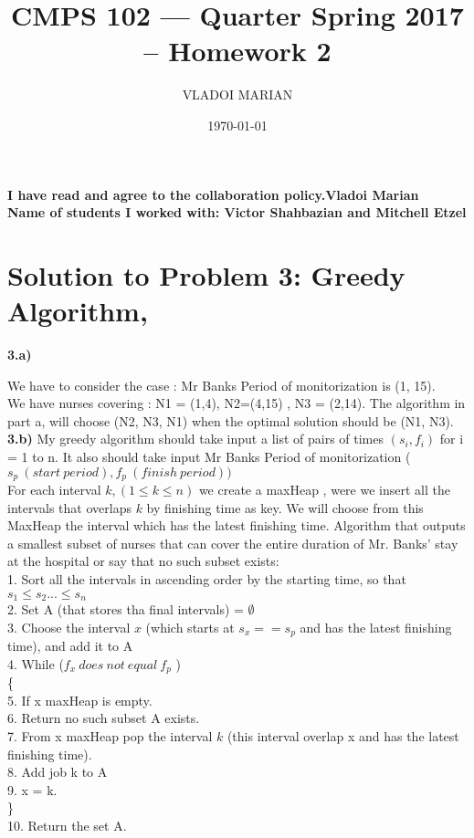 \documentclass[11 pt]{article}
\title{ CMPS 102 --- Quarter  Spring 2017 --  Homework 2}
\author{VLADOI MARIAN}
\date{\today}
\begin{document}
\maketitle



\begin{center}
{\bf I have read and agree to the collaboration policy.Vladoi Marian}\\
{\bf Name of students I worked with: Victor Shahbazian and Mitchell Etzel }
\end{center}


\section*{Solution to Problem 3: Greedy Algorithm,}

\textbf{3.a)} 

We have to consider the case : 
Mr Banks Period  of monitorization is (1, 15). \\
We have nurses covering : N1 = (1,4), N2=(4,15) , N3 = (2,14).   The algorithm in part a, will choose (N2, N3, N1) when the optimal solution should be (N1, N3).\\


\textbf{3.b)}  My greedy algorithm should take input a list of pairs of times $(s_i, f_i) $ for i = 1 to n. It also should take input Mr Banks Period  of monitorization ($s_p \  (start \ period), f_p \  (finish \ period))$\\ 
For each interval $k, (  1 \leq k \leq n )$ we create a maxHeap , were we insert all the intervals that overlaps $ k $ by finishing time as key. We will choose from this MaxHeap the interval which has the latest finishing time.
Algorithm that outputs a smallest subset of nurses that can cover the entire duration of Mr. Banks’ stay at the hospital or say that no such subset exists:\\

1. Sort all the intervals in ascending order by the starting time, so that $s_1 \leq s_2 ... \leq s_n$\\
2. Set A (that stores tha final intervals) = $\emptyset$\\
3. Choose the interval $x$ (which starts at $s_x== s_p$ and has the latest finishing time), and add it to A\\
4. While ($f_x \ does \ not \ equal \ f_p$ ) \\ \{ \\
5. If x maxHeap is empty.\\
6. Return no such subset  A exists.\\
7. From x maxHeap pop the interval  $k$  (this interval overlap x and  has the latest finishing time).\\
8. Add job k to A\\
9. x = k.\\
\} \\
10. Return the set A.\\
\end{document}
